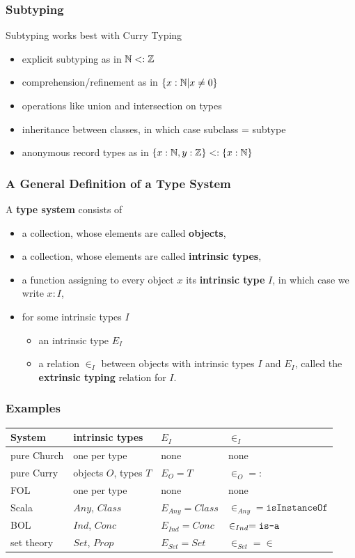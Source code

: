 \begin{frame}\frametitle{Subtyping}
Subtyping works best with Curry Typing
\begin{itemize}
 \item explicit subtyping as in $\mathbb{N}<:\mathbb{Z}$
 \item comprehension/refinement as in $\{x:\mathbb{N}|x\neq 0\}$
 \item operations like union and intersection on types
 \item inheritance between classes, in which case subclass = subtype
 \item anonymous record types as in $\{x:\mathbb{N},y:\mathbb{Z}\}<:\{x:\mathbb{N}\}$
\end{itemize}
\end{frame}

\begin{frame}\frametitle{A General Definition of a Type System}
A \textbf{type system} consists of
\begin{itemize}
 \item a collection, whose elements are called \textbf{objects},
 \item a collection, whose elements are called \textbf{intrinsic types},
 \item a function assigning to every object $x$ its \textbf{intrinsic type} $I$, in which case we write $x:I$,
 \item for some intrinsic types $I$
  \begin{itemize}
   \item an intrinsic type $E_I$
   \item a relation $\in_I$ between objects with intrinsic types $I$ and $E_I$, called the \textbf{extrinsic typing} relation for $I$.
  \end{itemize}
\end{itemize}
\end{frame}

\begin{frame}\frametitle{Examples}
\begin{center}
\begin{tabular}{l|lll}
System & intrinsic types & $E_I$ & $\in_I$ \\
\hline
pure Church & one per type & none & none \\
pure Curry & objects $O$, types $T$ & $E_O=T$ & $\in_O=:$ \\
FOL & one per type & none & none \\
Scala & $Any$, $Class$ & $E_{Any}=Class$ & $\in_{Any}=\mathtt{isInstanceOf}$\\ 
BOL & $Ind$, $Conc$ & $E_{Ind}=Conc$ & $\in_{Ind}=\mathop{\texttt{is-a}}$\\
set theory & $Set$, $Prop$ & $E_{Set}=Set$ & $\in_{Set}=\in$ \\
\end{tabular}
\end{center}
\end{frame}


